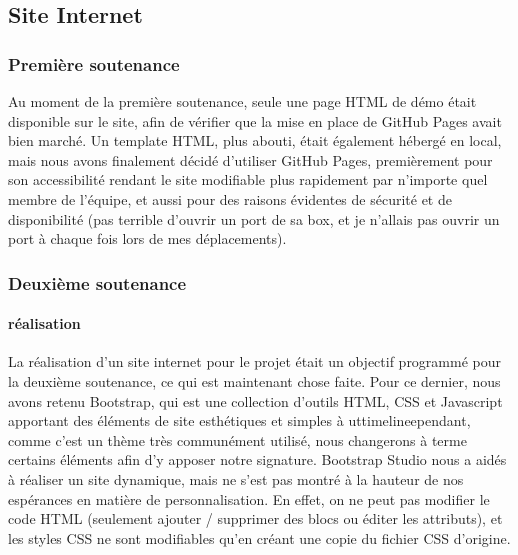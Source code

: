 \subsection{Site Internet}

    \subsubsection{Première soutenance}

        Au moment de la première soutenance, seule une page HTML de démo était disponible sur le site, afin de vérifier 
        que la mise en place de GitHub Pages avait bien marché. Un template HTML, plus abouti, était également hébergé en local, 
        mais nous avons finalement décidé d'utiliser GitHub Pages, premièrement pour son accessibilité rendant le site modifiable 
        plus rapidement par n'importe quel membre de l'équipe, et aussi pour des raisons évidentes de sécurité et de disponibilité 
        (pas terrible d'ouvrir un port de sa box, et je n'allais pas ouvrir un port à chaque fois lors de mes déplacements).

    \subsubsection{Deuxième soutenance}

        \paragraph{réalisation}

            La réalisation d'un site internet pour le projet était un objectif
            programmé pour la deuxième soutenance, ce qui est maintenant chose faite.
            Pour ce dernier, nous avons retenu Bootstrap, qui est une collection
            d'outils HTML, CSS et Javascript apportant des éléments de site
            esthétiques et simples à uttimelineependant, comme c'est un thème très 
            communément utilisé, nous changerons à terme certains éléments afin 
            d'y apposer notre signature. Bootstrap Studio nous a aidés à réaliser
            un site dynamique, mais ne s'est pas montré à la hauteur de nos espérances
            en matière de personnalisation. En effet, on ne peut pas modifier
            le code HTML (seulement ajouter / supprimer des blocs ou éditer les
            attributs), et les styles CSS ne sont modifiables qu'en créant une copie
            du fichier CSS d'origine.


